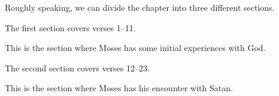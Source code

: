 \begin{compactitem}
			\item Roughly speaking, we can divide the chapter into three different sections.
				\begin{compactitem}
					\item The first section covers verses 1--11.
						\begin{compactitem}
							\item This is the section where Moses has some initial experiences with God.
						\end{compactitem}
					\item The second section covers verses 12--23.
						\begin{compactitem}
							\item This is the section where Moses has his encounter with Satan.
						\end{compactitem}
				\end{compactitem}
				

\end{compactitem}
